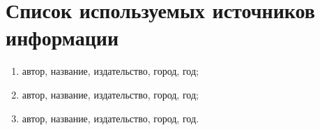 
\newpage
\section{Список используемых источников информации}

\begin{enumerate}
  \item{автор, название, издательство, город, год;}
  \item{автор, название, издательство, город, год;}
  \item{автор, название, издательство, город, год.}
\end{enumerate}
